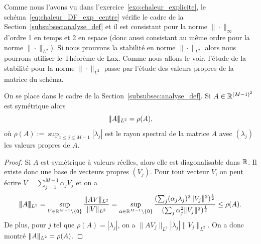 \documentclass[12pt,a4paper,twoside]{article}
\begin{document}
Comme nous l'avons vu dans l'exercice~\ref{exo:chaleur_explicite},
le sch\'ema~\eqref{eq:chaleur_DF_exp_centre} v\'erifie le cadre
de la Section~\ref{subsubsec:analyse_def} et il est consistant pour la norme $\| \cdot \|_{\infty}$
d'ordre 1 en temps et 2 en espace (donc aussi consistant au m\^eme ordre pour la norme
$\| \cdot \|_{L^2}$). Si nous prouvons la stabilit\'e en norme $\| \cdot \|_{L^2}$
alors nous pourrons utiliser le Th\'eor\`eme de Lax.
Comme nous allons le voir, l'\'etude de la stabilit\'e pour la norme $\| \cdot \|_{L^2}$
passe par l'\'etude des valeurs propres de la matrice du sch\'ema.

\begin{proposition}
  \label{prop:stabL2}
  On se place dans le cadre de la Section~\ref{subsubsec:analyse_def}.
  Si $A \in \mathbb{R}^{(M-1)^2}$ est sym\'etrique alors
  \begin{equation*}
    |\!|\!| A |\!|\!|_{L^2} = \rho(A) ,
  \end{equation*}
  o\`u $\rho(A) := \sup_{1 \leq j \leq M-1} |\lambda_j|$ est le rayon spectral de la matrice $A$
  avec $(\lambda_j)$ les valeurs propres de $A$.
\end{proposition}

\begin{proof}
  Si $A$ est sym\'etrique \`a valeurs r\'eelles, alors elle est diagonalisable dans $\mathbb{R}$.
  Il existe donc une base de vecteurs propres $(V_j)$.
  Pour tout vecteur $V$, on peut \'ecrire $V = \sum_{j=1}^{M-1} \alpha_j V_j$ et on a
  \begin{align*}
    |\!|\!| A |\!|\!|_{L^2} = \sup_{V \in \mathbb{R}^{M-1}\setminus\{0\}} \dfrac{\| A V \|_{L^2}}{\| V \|_{L^2}}
    = \sup_{\alpha \in \mathbb{R}^{M-1}\setminus\{0\}}
    \dfrac{(\sum_j (\alpha_j \lambda_j)^2 \| V_j \|^2)^{\frac12}}{(\sum_j \alpha_j^2 \| V_j \|^2)^{\frac12}}
    \leq \rho(A) .
  \end{align*}
  De plus, pour $j$ tel que $\rho(A) = | \lambda_j |$,
  on a $\| A V_j \|_{L^2} | \lambda_j | \| V_j \|_{L^2}$.
  On a donc montr\'e $|\!|\!| A |\!|\!|_{L^2} = \rho(A)$.
\end{proof}
\end{document}
